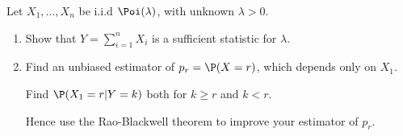 
\begin{exercise}

Let $X_1,\dots,X_n$ be i.i.d $\Poi(\lambda)$, with unknown $\lambda > 0$.

\begin{enumerate}[label = (\alph*)]
    \item Show that $Y = \sum_{i=1}^n X_i$ is a sufficient statistic for $\lambda$.
    \item Find an unbiased estimator of $p_r = \P(X = r)$, which depends only
    on $X_1$.

    Find $\P(X_1 = r | Y = k)$ both for $k \geq r$ and $k < r$.

    Hence use the Rao-Blackwell theorem to improve your estimator of $p_r$.
\end{enumerate}

\end{exercise}


\begin{solution}

\phantom{}

\end{solution}

